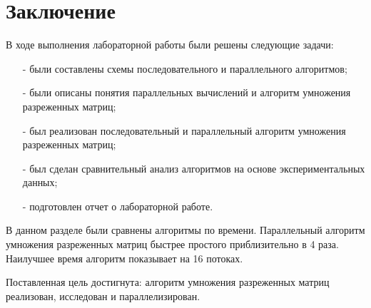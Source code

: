 \chapter*{Заключение}

В ходе выполнения лабораторной работы были решены следующие задачи:
\begin{itemize}
	\item[-] были составлены схемы последовательного и параллельного алгоритмов;
	\item[-] были описаны понятия параллельных вычислений и алгоритм умножения разреженных матриц;
	\item[-] был реализован последовательный и параллельный алгоритм умножения разреженных матриц;
	\item[-] был сделан сравнительный анализ алгоритмов на основе экспериментальных данных;
	\item[-] подготовлен отчет о лабораторной работе.
\end{itemize}

В данном разделе были сравнены алгоритмы по времени. Параллельный алгоритм умножения разреженных матриц быстрее простого приблизительно в 4 раза. Наилучшее время алгоритм показывает на 16 потоках.

Поставленная цель достигнута: алгоритм умножения разреженных матриц реализован, исследован и параллелизирован.